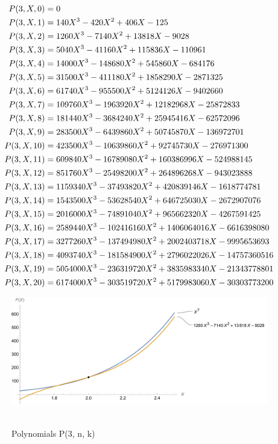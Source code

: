 ﻿\begin{align*}
    {P}(3,X,0) &= 0 \\
    {P}(3,X,1) &= 140X^3 - 420X^2 + 406X - 125 \\
    {P}(3,X,2) &= 1260X^3 - 7140X^2 + 13818X - 9028 \\
    {P}(3,X,3) &= 5040X^3 - 41160X^2 + 115836X - 110961 \\
    {P}(3,X,4) &= 14000X^3 - 148680X^2 + 545860X - 684176 \\
    {P}(3,X,5) &= 31500X^3 - 411180X^2 + 1858290X - 2871325 \\
    {P}(3,X,6) &= 61740X^3 - 955500X^2 + 5124126X - 9402660 \\
    {P}(3,X,7) &= 109760X^3 - 1963920X^2 + 12182968X - 25872833 \\
    {P}(3,X,8) &= 181440X^3 - 3684240X^2 + 25945416X - 62572096 \\
    {P}(3,X,9) &= 283500X^3 - 6439860X^2 + 50745870X - 136972701 \\
    {P}(3,X,10) &= 423500X^3 - 10639860X^2 + 92745730X - 276971300 \\
    {P}(3,X,11) &= 609840X^3 - 16789080X^2 + 160386996X - 524988145 \\
    {P}(3,X,12) &= 851760X^3 - 25498200X^2 + 264896268X - 943023888 \\
    {P}(3,X,13) &= 1159340X^3 - 37493820X^2 + 420839146X - 1618774781 \\
    {P}(3,X,14) &= 1543500X^3 - 53628540X^2 + 646725030X - 2672907076 \\
    {P}(3,X,15) &= 2016000X^3 - 74891040X^2 + 965662320X - 4267591425 \\
    {P}(3,X,16) &= 2589440X^3 - 102416160X^2 + 1406064016X - 6616398080 \\
    {P}(3,X,17) &= 3277260X^3 - 137494980X^2 + 2002403718X - 9995653693 \\
    {P}(3,X,18) &= 4093740X^3 - 181584900X^2 + 2796022026X - 14757360516 \\
    {P}(3,X,19) &= 5054000X^3 - 236319720X^2 + 3835983340X - 21343778801 \\
    {P}(3,X,20) &= 6174000X^3 - 303519720X^2 + 5179983060X - 30303773200
\end{align*}
\begin{figure}[H]
    \centering
    \includegraphics[width=1\textwidth]{sections/images/05_seventh_power_with_p_3_n_k}
    ~\caption{Polynomials P(3, n, k)}\label{fig:figure5}
\end{figure}
